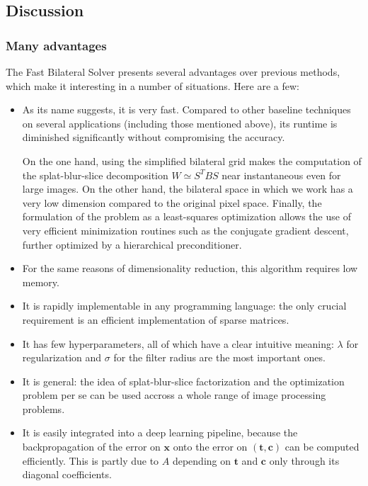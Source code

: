\documentclass{article}
\begin{document}
\subsection{Discussion}

\subsubsection{Many advantages}

The Fast Bilateral Solver presents several advantages over previous methods, which make it interesting in a number of situations. Here are a few:

\begin{itemize}
    \item As its name suggests, it is very fast. Compared to other baseline techniques on several applications (including those mentioned above), its runtime is diminished significantly without compromising the accuracy.
    
    On the one hand, using the simplified bilateral grid makes the computation of the splat-blur-slice decomposition $W \simeq S^T B S$ near instantaneous even for large images. On the other hand, the bilateral space in which we work has a very low dimension compared to the original pixel space. Finally, the formulation of the problem as a least-squares optimization allows the use of very efficient minimization routines such as the conjugate gradient descent, further optimized by a hierarchical preconditioner.
    
    \item For the same reasons of dimensionality reduction, this algorithm requires low memory.
    
    \item It is rapidly implementable in any programming language: the only crucial requirement is an efficient implementation of sparse matrices.
    
    \item It has few hyperparameters, all of which have a clear intuitive meaning: $\lambda$ for regularization and $\sigma$ for the filter radius are the most important ones.
    
    \item It is general: the idea of splat-blur-slice factorization and the optimization problem per se can be used accross a whole range of image processing problems.
    
    \item It is easily integrated into a deep learning pipeline, because the backpropagation of the error on $\textbf{x}$ onto the error on $(\textbf{t}, \textbf{c})$ can be computed efficiently. This is partly due to $A$ depending on $\textbf{t}$ and $\textbf{c}$ only through its diagonal coefficients.
    
\end{itemize}
\end{document}
